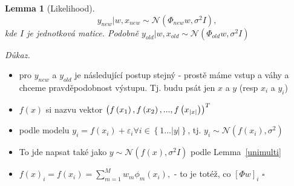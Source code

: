 \documentclass{article}
\newenvironment{pitemize}{
\begin{itemize}
  \setlength{\itemsep}{5pt}
  \setlength{\parskip}{0pt}
  \setlength{\parsep}{0pt}
}{\end{itemize}}
\newenvironment{pproof}{
\noindent\emph{Důkaz.}
\begin{pitemize}
}{\hfill$\square$\end{pitemize}}
\newcommand{\NN}{\mathcal{N}}
\newtheorem{lemma}{Lemma}
\theoremstyle{definition}
\begin{document}
\begin{lemma}[Likelihood]
\label{likelihood}
$$y_{new}|w,x_{new}\sim\NN(\Phi_{new}w,\sigma^2I),$$ kde $I$ je jednotková matice.
 Podobně $y_{old}|w,x_{old}\sim\NN(\Phi_{old}w,\sigma^2I)$\end{lemma}

\begin{pproof}
\item pro $y_{new}$ a $y_{old}$ je následující postup stejný - prostě máme vstup a váhy a chceme prav\-dě\-po\-dob\-nost výstupu. Tj. budu psát jen $x$ a $y$ (resp $x_i$ a $y_i$) 
\item $f(x)$ si nazvu vektor $\left(f\left(x_1\right),f\left(x_2\right),...,\\f\left(x_{\left|x\right|}\right)\right)^T$
\item podle modelu $y_i=f\left(x_i\right)+\varepsilon_i \forall i \in \left\{1...\left|y\right|\right\}$, tj. $y_i\sim\NN\left(f\left(x_i\right),\sigma^2\right)$
\item To jde napsat také jako $y \sim\NN(f(x),\sigma^2I)$ podle Lemma~\ref{unimulti}
\item $f(x)_i=f(x_i)= \sum_{m=1}^Mw_m\phi_m(x_i),$ - to je totéž, co $[\Phi w]_i$
\end{pproof}
\end{document}
